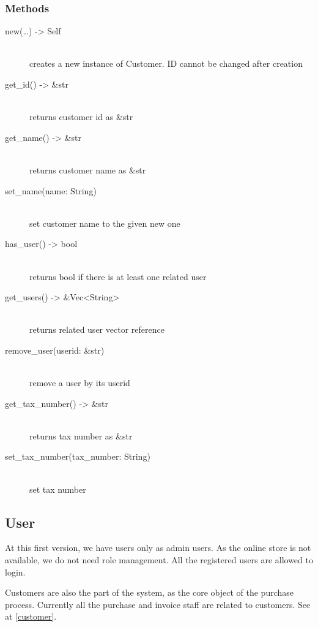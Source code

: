 \documentclass{article}
\begin{document}
\subsubsection{Methods}

\begin{description}
  \item[new(\dots) -> Self] \hfill
        \\ creates a new instance of Customer. ID cannot be changed after
        creation
  \item[get\_id() -> \&str] \hfill
        \\ returns customer id as \&str
  \item[get\_name() -> \&str] \hfill
        \\ returns customer name as \&str
  \item[set\_name(name: String)] \hfill
        \\ set customer name to the given new one
  \item[has\_user() -> bool] \hfill
        \\ returns bool if there is at least one related user
  \item[get\_users() -> \&Vec<String>] \hfill
        \\ returns related user vector reference
  \item[remove\_user(userid: \&str)]  \hfill
        \\ remove a user by its userid
  \item[get\_tax\_number() -> \&str] \hfill
        \\ returns tax number as \&str
  \item[set\_tax\_number(tax\_number: String)] \hfill
        \\ set tax number
\end{description}

\newpage

\subsection{User}

At this first version, we have users only as admin users. As the online store
is not available, we do not need role management. All the registered users are
allowed to login.

Customers are also the part of the system, as the core object of the purchase process.
Currently all the purchase and invoice staff are related to customers. See at \ref{customer}.
\end{document}
